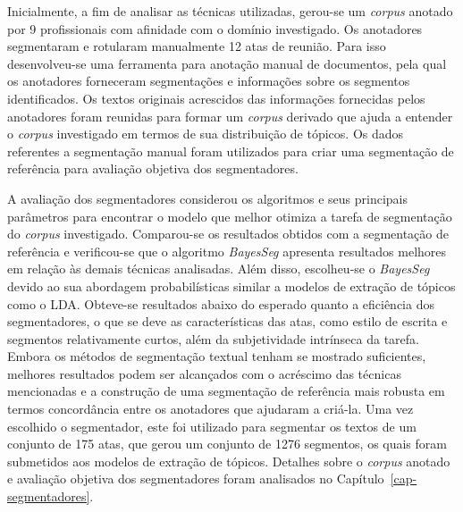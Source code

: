 Inicialmente, a fim de analisar as técnicas utilizadas, gerou-se um \textit{corpus} anotado por 9 profissionais com afinidade com o domínio investigado. Os anotadores segmentaram e rotularam manualmente 12 atas de reunião. 
Para isso desenvolveu-se uma ferramenta para anotação manual de documentos, pela qual os anotadores forneceram segmentações e informações sobre os segmentos identificados.
Os textos originais acrescidos das informações fornecidas pelos anotadores foram reunidas para formar um \textit{corpus} derivado que ajuda a entender o \textit{corpus} investigado em termos de sua distribuição de tópicos. Os dados referentes a segmentação manual foram utilizados para criar uma segmentação de referência para avaliação objetiva dos segmentadores. 

A avaliação dos segmentadores considerou os algoritmos e seus principais parâmetros para encontrar o modelo que melhor otimiza a tarefa de segmentação do \textit{corpus} investigado. Comparou-se os resultados obtidos com a segmentação de referência e verificou-se que o algoritmo \textit{BayesSeg} apresenta resultados melhores em relação às demais técnicas analisadas. Além disso, escolheu-se o \textit{BayesSeg} devido ao sua abordagem probabilísticas similar a modelos de extração de tópicos como o LDA. 
Obteve-se resultados abaixo do esperado quanto a eficiência dos segmentadores, o que se deve as características das atas, como estilo de escrita e segmentos relativamente curtos, além da subjetividade intrínseca da tarefa.
Embora os métodos de segmentação textual tenham se mostrado suficientes, melhores resultados podem ser alcançados com o acréscimo das técnicas mencionadas e a construção de uma segmentação de referência mais robusta em termos concordância entre os anotadores que ajudaram a criá-la.
Uma vez escolhido o segmentador, este foi utilizado para segmentar os textos de um conjunto de 175 atas, que gerou um conjunto de 1276 segmentos, os quais foram submetidos aos modelos de extração de tópicos.
Detalhes sobre o \textit{corpus} anotado e avaliação objetiva dos segmentadores foram analisados no Capítulo~\ref{cap-segmentadores}.




